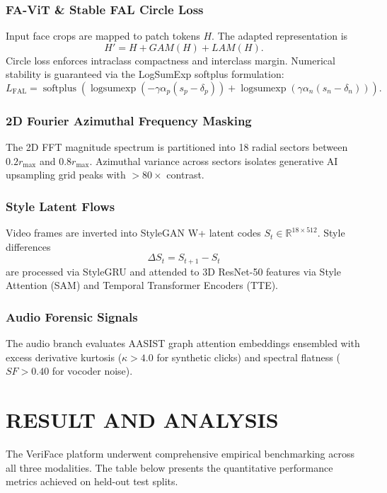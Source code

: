 \documentclass[12pt,a4paper]{report}
\begin{document}
\subsection{FA-ViT \& Stable FAL Circle Loss}
Input face crops are mapped to patch tokens $H$. The adapted representation is
\[
H' = H + GAM(H) + LAM(H).
\]
Circle loss enforces intraclass compactness and interclass margin. Numerical stability is guaranteed via the LogSumExp softplus formulation:
\[
L_{\mathrm{FAL}} =
\operatorname{softplus}\left(
\operatorname{logsumexp}(-\gamma \alpha_p(s_p-\delta_p))
+
\operatorname{logsumexp}(\gamma \alpha_n(s_n-\delta_n))
\right).
\]

\subsection{2D Fourier Azimuthal Frequency Masking}
The 2D FFT magnitude spectrum is partitioned into 18 radial sectors between $0.2r_{\max}$ and $0.8r_{\max}$. Azimuthal variance across sectors isolates generative AI upsampling grid peaks with $>80\times$ contrast.

\subsection{Style Latent Flows}
Video frames are inverted into StyleGAN W+ latent codes $S_t \in \mathbb{R}^{18\times512}$. Style differences
\[
\Delta S_t = S_{t+1}-S_t
\]
are processed via StyleGRU and attended to 3D ResNet-50 features via Style Attention (SAM) and Temporal Transformer Encoders (TTE).

\subsection{Audio Forensic Signals}
The audio branch evaluates AASIST graph attention embeddings ensembled with excess derivative kurtosis ($\kappa>4.0$ for synthetic clicks) and spectral flatness ($SF>0.40$ for vocoder noise).

\chapter{RESULT AND ANALYSIS}

The VeriFace platform underwent comprehensive empirical benchmarking across all three modalities. The table below presents the quantitative performance metrics achieved on held-out test splits.
\end{document}
